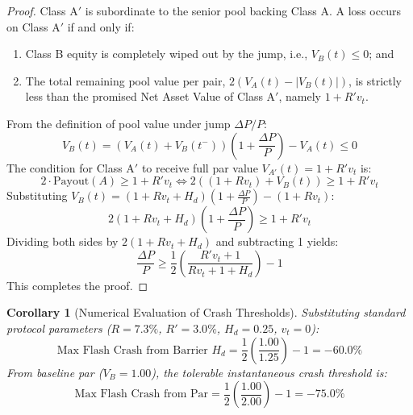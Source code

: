 \documentclass[11pt,a4paper]{article}
\newtheorem{corollary}[theorem]{Corollary}
\begin{document}
\begin{proof}
Class A$'$ is subordinate to the senior pool backing Class A. A loss occurs on Class A$'$ if and only if:
\begin{enumerate}[label=(\alph*)]
    \item Class B equity is completely wiped out by the jump, i.e., $V_B(t) \le 0$; and
    \item The total remaining pool value per pair, $2(V_A(t) - |V_B(t)|)$, is strictly less than the promised Net Asset Value of Class A$'$, namely $1 + R' v_t$.
\end{enumerate}

From the definition of pool value under jump $\Delta P / P$:
\begin{equation}
    V_B(t) = (V_A(t) + V_B(t^-))\left(1 + \frac{\Delta P}{P}\right) - V_A(t) \le 0
\end{equation}
The condition for Class A$'$ to receive full par value $V_{A'}(t) = 1 + R' v_t$ is:
\begin{equation}
    2 \cdot \text{Payout}(A) \ge 1 + R' v_t \iff 2 \left( (1 + R v_t) + V_B(t) \right) \ge 1 + R' v_t
\end{equation}
Substituting $V_B(t) = (1 + R v_t + H_d)(1 + \frac{\Delta P}{P}) - (1 + R v_t)$:
\begin{equation}
    2 (1 + R v_t + H_d)\left(1 + \frac{\Delta P}{P}\right) \ge 1 + R' v_t
\end{equation}
Dividing both sides by $2 (1 + R v_t + H_d)$ and subtracting 1 yields:
\begin{equation}
    \frac{\Delta P}{P} \ge \frac{1}{2} \left( \frac{R' v_t + 1}{R v_t + 1 + H_d} \right) - 1
\end{equation}
This completes the proof.
\end{proof}

\begin{corollary}[Numerical Evaluation of Crash Thresholds]
Substituting standard protocol parameters ($R = 7.3\%$, $R' = 3.0\%$, $H_d = 0.25$, $v_t = 0$):
\begin{equation}
    \text{Max Flash Crash from Barrier } H_d = \frac{1}{2} \left( \frac{1.00}{1.25} \right) - 1 = \mathbf{-60.0\%}
\end{equation}
From baseline par ($V_B = 1.00$), the tolerable instantaneous crash threshold is:
\begin{equation}
    \text{Max Flash Crash from Par} = \frac{1}{2} \left( \frac{1.00}{2.00} \right) - 1 = \mathbf{-75.0\%}
\end{equation}
\end{corollary}
\end{document}
